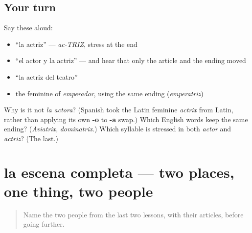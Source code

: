 \subsection*{Your turn}
Say these aloud:

\begin{itemize}
\raggedright
  \item \textquotedblleft{}la actriz\textquotedblright{} — \emph{ac-TRIZ}, stress at the end
  \item \textquotedblleft{}el actor y la actriz\textquotedblright{} — and hear that only the article and the ending moved
  \item \textquotedblleft{}la actriz del teatro\textquotedblright{}
  \item the feminine of \emph{emperador}, using the same ending (\emph{emperatriz})
\end{itemize}

\begin{tcolorbox}[breakable,colback=teal!4,colframe=teal!35!black,title={Before you move on}]
Why is it not \emph{la actora}? (Spanish took the Latin feminine \emph{actrix} from Latin, rather than applying its own \textbf{-o} to \textbf{-a} swap.) Which English words keep the same ending? (\emph{Aviatrix}, \emph{dominatrix}.) Which syllable is stressed in both \emph{actor} and \emph{actriz}? (The last.)
\end{tcolorbox}
\section[la escena completa]{la escena completa — two places, one thing, two people}

\label{lesson:ES-C421-repaso-escena}



\begin{quote}
Name the two people from the last two lessons, with their articles, before going further.
\end{quote}

